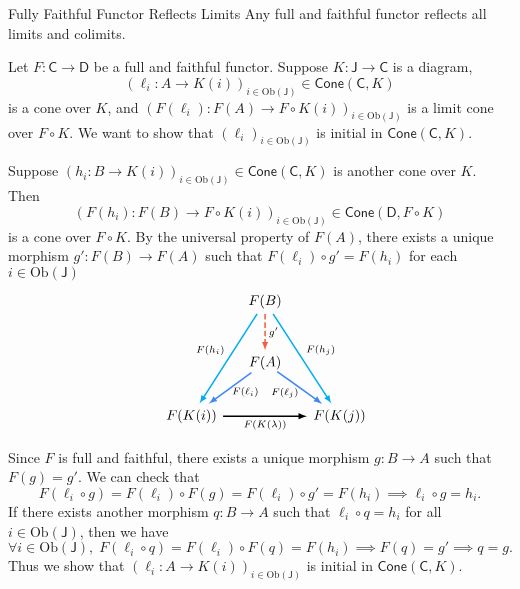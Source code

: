 \begin{proposition}{Fully Faithful Functor Reflects Limits}{}
    Any full and faithful functor reflects all limits and
colimits.
\end{proposition}

\begin{prf}
    Let $F: \mathsf{C} \rightarrow \mathsf{D}$ be a full and faithful functor. Suppose $K: \mathsf{J} \rightarrow \mathsf{C}$ is a diagram, 
    $$
    \left(\ell_i: A \rightarrow K(i)\right)_{i\in \mathrm{Ob}(\mathsf{J})}\in \mathsf{Cone}\left(\mathsf{C},K\right)
    $$ 
    is a cone over $K$, and $\left(F(\ell_i): F(A) \rightarrow F\circ K(i)\right)_{i\in \mathrm{Ob}(\mathsf{J})}$ is a limit cone over $F\circ K$. We want to show that $\left(\ell_i\right)_{i\in \mathrm{Ob}(\mathsf{J})}$ is initial in $\mathsf{Cone}\left(\mathsf{C},K\right)$.
    
    
    Suppose $\left(h_i:B \rightarrow K(i)\right)_{i\in \mathrm{Ob}(\mathsf{J})}\in \mathsf{Cone}\left(\mathsf{C},K\right)$ is another cone over $K$. Then 
    \[
    \left( F(h_i): F(B)\longrightarrow F\circ K(i)\right)_{i\in \mathrm{Ob}(\mathsf{J})}\in \mathsf{Cone}\left(\mathsf{D},F\circ K\right)
    \]
    is a cone over $F\circ K$. By the universal property of $F(A)$, there exists a unique morphism $g':F(B)\to F(A)$ such that $F(\ell_i) \circ g' = F(h_i)$ for each $i\in \mathrm{Ob}(\mathsf{J})$
    \[
        \begin{tikzcd}[ampersand replacement=\&, every arrow/.append style={-latex, line width=1.1pt}]
            \&   [-1.5em]                \&[-1em] F(B) \arrow[rdd, draw=cyan, "F(h_j)"] \arrow[ldd, draw=cyan, "F(h_i)"'] \arrow[d, dash pattern=on 4pt off 2pt, draw=arrowRed, "g'"] \& [-1em]                  \\[+0.3cm]
            \&                   \& F(A)\arrow[ld, draw=arrowBlue, shorten <=-3pt, "F(\ell_i)" yshift=4.5pt] \arrow[rd, draw=arrowBlue, shorten <=-4.5pt, "F(\ell_j)"' yshift=4pt]               \&                   \\[0.1cm]
        \& F(K(i)) \arrow[rr, "F(K(\lambda))"']\&   \& F(K(j))
        \end{tikzcd}
    \]
    
    Since $F$ is full and faithful, there exists a unique morphism $g:B\to A$ such that $F(g)=g'$. We can check that  
    \[
        F\left(\ell_i \circ g\right)=F\left(\ell_i \right)\circ F\left( g\right)=F\left(\ell_i \right)\circ g'=F\left(h_i\right)\implies \ell_i \circ g=h_i.
    \]
    If there exists another morphism $q:B\to A$ such that $\ell_i \circ q=h_i$ for all $i\in\mathrm{Ob}\left(\mathsf{J}\right)$, then we have
    \[
    \forall i \in\mathrm{Ob}\left(\mathsf{J}\right),\;F\left( \ell_i \circ q\right)=F\left(\ell_i \right)\circ F\left( q\right)=F\left(h_i\right)\implies F\left( q\right)=g'\implies q=g.
    \]
    Thus we show that $\left(\ell_i:A\to K(i)\right)_{i\in \mathrm{Ob}(\mathsf{J})}$ is initial in $\mathsf{Cone}\left(\mathsf{C},K\right)$.
\end{prf}


